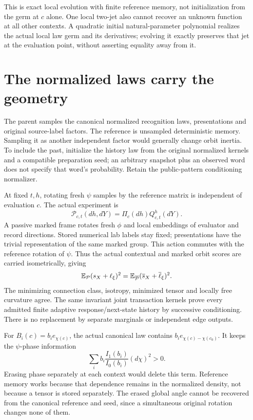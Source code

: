 This is exact local evolution with finite reference memory, not initialization from the germ at $c$ alone. One local two-jet also cannot recover an unknown function at all other contexts. A quadratic initial natural-parameter polynomial realizes the actual local law germ and its derivatives; evolving it exactly preserves that jet at the evaluation point, without asserting equality away from it.

\section{The normalized laws carry the geometry}

The parent samples the canonical normalized recognition laws, presentations and original source-label factors. The reference is unsampled deterministic memory. Sampling it as another independent factor would generally change orbit inertia. To include the past, initialize the history law from the original normalized kernels and a compatible preparation seed; an arbitrary snapshot plus an observed word does not specify that word's probability. Retain the public-pattern conditioning normalizer.

At fixed $t,h$, rotating fresh $\psi$ samples by the reference matrix is independent of evaluation $c$. The actual experiment is
\begin{equation}
 \mathcal P_{c,t}(dh,dY)=\Pi_c(dh)Q_{c,t}^h(dY).
 \label{clp:experiment}
\end{equation}
A passive marked frame rotates fresh $\phi$ and local embeddings of evaluator and record directions. Stored numerical lab labels stay fixed; presentations have the trivial representation of the same marked group. This action commutes with the reference rotation of $\psi$. Thus the actual contextual and marked orbit scores are carried isometrically, giving
\begin{equation}
 \mathbb E_{\mathcal P}(s_X+\ell_\xi)^2
 =\mathbb E_{\overline{\mathcal P}}(\overline s_X+\overline\ell_\xi)^2.
 \label{clp:cost}
\end{equation}
The minimizing connection class, isotropy, minimized tensor and locally free curvature agree. The same invariant joint transaction kernels prove every admitted finite adaptive response/next-state history by successive conditioning. There is no replacement by separate marginals or independent edge outputs.

For $B_i(c)=b_i e_{\chi(c)}$, the actual canonical law contains $b_i e_{\chi(c)-\chi(c_0)}$. It keeps the $\psi$-phase information
\begin{equation}
 \sum_i b_i\frac{I_1(b_i)}{I_0(b_i)}(d\chi)^2>0.
 \label{clp:missing-score}
\end{equation}
Erasing phase separately at each context would delete this term. Reference memory works because that dependence remains in the normalized density, not because a tensor is stored separately. The erased global angle cannot be recovered from the canonical reference and seed, since a simultaneous original rotation changes none of them.

